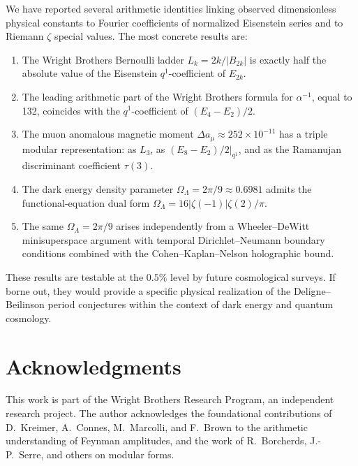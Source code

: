 \documentclass[11pt,a4paper]{article}
\begin{document}
We have reported several arithmetic identities linking observed
dimensionless physical constants to Fourier coefficients of
normalized Eisenstein series and to Riemann $\zeta$ special values.
The most concrete results are:
\begin{enumerate}
\item[(i)] The Wright Brothers Bernoulli ladder
$L_k = 2k/|B_{2k}|$ is exactly half the absolute value of the
Eisenstein $q^1$-coefficient of $E_{2k}$.
\item[(ii)] The leading arithmetic part of the Wright Brothers
formula for $\alpha^{-1}$, equal to 132, coincides with the
$q^1$-coefficient of $(E_4 - E_2)/2$.
\item[(iii)] The muon anomalous magnetic moment
$\Delta a_\mu \approx 252 \times 10^{-11}$ has a triple modular
representation: as $L_3$, as $(E_8 - E_2)/2|_{q^1}$, and as the
Ramanujan discriminant coefficient $\tau(3)$.
\item[(iv)] The dark energy density parameter
$\Omega_\Lambda = 2\pi/9 \approx 0.6981$ admits the
functional-equation dual form
$\Omega_\Lambda = 16|\zeta(-1)|\zeta(2)/\pi$.
\item[(v)] The same $\Omega_\Lambda = 2\pi/9$ arises independently
from a Wheeler--DeWitt minisuperspace argument with temporal
Dirichlet--Neumann boundary conditions combined with the
Cohen--Kaplan--Nelson holographic bound.
\end{enumerate}

These results are testable at the $0.5\%$ level by future
cosmological surveys. If borne out, they would provide a specific
physical realization of the Deligne--Beilinson period conjectures
within the context of dark energy and quantum cosmology.

\section*{Acknowledgments}

This work is part of the Wright Brothers Research Program, an
independent research project. The author acknowledges the
foundational contributions of D.~Kreimer, A.~Connes, M.~Marcolli,
and F.~Brown to the arithmetic understanding of Feynman amplitudes,
and the work of R.~Borcherds, J.-P.~Serre, and others on modular
forms.
\end{document}
